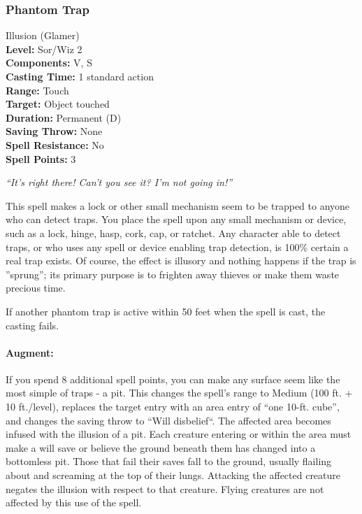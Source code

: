 \subsubsection{Phantom Trap}
\label{Spell:PhantomTrap}
Illusion (Glamer)
\\ \textbf{Level:} Sor/Wiz 2
\\ \textbf{Components:} V, S
\\ \textbf{Casting Time:} 1 standard action
\\ \textbf{Range:} Touch
\\ \textbf{Target:} Object touched
\\ \textbf{Duration:} Permanent (D)
\\ \textbf{Saving Throw:} None
\\ \textbf{Spell Resistance:} No
\\ \textbf{Spell Points:} 3

\emph{``It's right there! Can't you see it? I'm not going in!''}

This spell makes a lock or other small mechanism seem to be trapped to anyone who can detect traps. 
You place the spell upon any small mechanism or device, such as a lock, hinge, hasp, cork, cap, or ratchet. 
Any character able to detect traps, or who uses any spell or device enabling trap detection, 
is 100\% certain a real trap exists. Of course, the effect is illusory and nothing happens if the trap is ''sprung''; 
its primary purpose is to frighten away thieves or make them waste precious time.

If another phantom trap is active within 50 feet when the spell is cast, the casting fails.

\paragraph{Augment:} If you spend 8 additional spell points, you can make any surface seem like the most simple of traps - a pit.
This changes the spell's range to Medium (100 ft. + 10 ft./level), replaces the target entry with an area entry of
``one 10-ft. cube'', and changes the saving throw to ``Will disbelief``.
The affected area becomes infused with the illusion of a pit.
Each creature entering or within the area must make a will save or believe the ground beneath them has changed into a bottomless pit.
Those that fail their saves fall to the ground, usually flailing about and screaming at the top of their lungs.
Attacking the affected creature negates the illusion with respect to that creature.
Flying creatures are not affected by this use of the spell.

